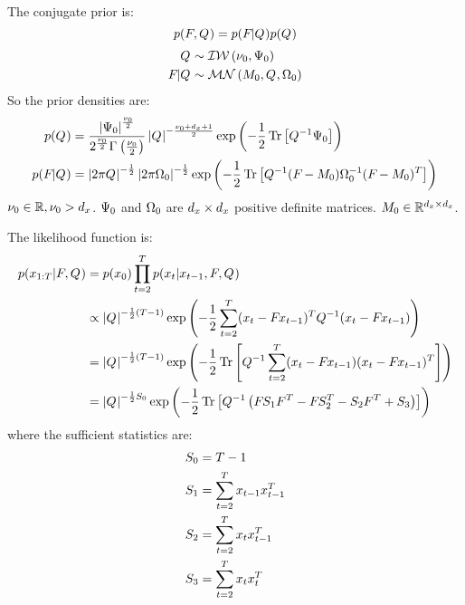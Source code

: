 \documentclass[a4paper,10pt]{article}
\begin{document}
The conjugate prior is:
\begin{equation}
 p(F_{}, Q_{}) =  p(F_{} | Q_{}) p(Q_{})
\end{equation}
\begin{align}
 Q_{} &\sim \mathcal{IW}\left(\nu_0,\Psi_0\right) \\
 F_{} | Q_{} &\sim \mathcal{MN}\left(M_0,Q_{},\Omega_0\right)
\end{align}
%
So the prior densities are:
\begin{align}
p(Q_{}) &= \frac{ \left|\Psi_0\right|^{\frac{\nu_0}{2}} }{ 2^{\frac{\nu_0}{2}} \Gamma_{}\left(\frac{\nu_0}{2}\right) } \left|Q_{}\right|^{-\frac{\nu_0+d_x+1}{2}} \exp\left( -\frac{1}{2} \operatorname{Tr}\left[Q_{}^{-1}\Psi_0\right] \right) \\
p(F_{} | Q_{}) &= \left|2 \pi Q_{}\right|^{-\frac{1}{2}} \left|2 \pi \Omega_0\right|^{-\frac{1}{2}} \exp\left(-\frac{1}{2} \operatorname{Tr}\left[ Q_{}^{-1} (F_{}-M_0) \Omega_0^{-1} (F_{}-M_0)^{T} \right] \right) 
\end{align}
%
$\nu_0\in\mathbb{R}, \nu_0>d_x$. $\Psi_0$ and $\Omega_0$ are $d_x\times d_x$ positive definite matrices. $M_0 \in \mathbb{R}^{d_x\times d_x}$.

The likelihood function is:
\begin{align}
 p(x_{1:T}|F_{}, Q_{}) &= p(x_{0}) \prod_{t=2}^{T} p(x_{t}|x_{t-1},F_{},Q_{}) \nonumber \\
 &\propto \left|Q_{}\right|^{-\frac{1}{2}(T-1)} \exp\left( -\frac{1}{2} \sum_{t=2}^{T} (x_{t}-F_{}x_{t-1})^{T} Q_{}^{-1} (x_{t}-F_{}x_{t-1}) \right) \nonumber \\
 &= \left|Q_{}\right|^{-\frac{1}{2}(T-1)} \exp\left(-\frac{1}{2}\operatorname{Tr}\left[ Q_{}^{-1} \sum_{t=2}^{T} (x_{t}-F_{}x_{t-1})(x_{t}-F_{}x_{t-1})^{T} \right]\right) \nonumber \\
 &= \left|Q_{}\right|^{-\frac{1}{2}S_{0}} \exp\left(-\frac{1}{2}\operatorname{Tr}\left[ Q_{}^{-1} \left( F_{} S_{1} F_{}^{T} - F_{} S_{2}^{T} - S_{2} F_{}^{T} + S_{3} \right) \right]\right)
\end{align}
%
where the sufficient statistics are:
%
\begin{align}
 S_{0} &= T - 1 \\
 S_{1} &= \sum_{t=2}^{T} x_{t-1}x_{t-1}^{T} \\
 S_{2} &= \sum_{t=2}^{T} x_{t}x_{t-1}^{T} \\
 S_{3} &= \sum_{t=2}^{T} x_{t}x_{t}^{T} \\
\end{align}
\end{document}
